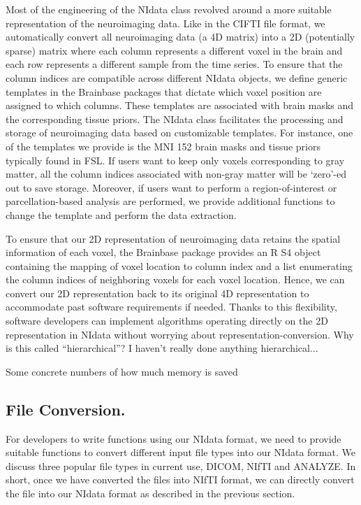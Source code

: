 \documentclass{nature}
\begin{document}
Most of the engineering of the NIdata class revolved around a more suitable
representation of the neuroimaging data. Like in the CIFTI file format\cite{Glasser2013The},
we automatically convert all neuroimaging data (a 4D matrix) 
into a 2D (potentially sparse) matrix where each
column represents a different voxel 
in the brain and each row represents 
a different sample from the time series. To ensure that the column indices are
compatible across different NIdata objects, we define generic templates in the
Brainbase packages that dictate which voxel position are assigned to which columns.
These templates are associated with brain masks and the corresponding tissue
priors.
The NIdata class facilitates the processing
and storage of neuroimaging data based on customizable
templates. 
For instance, one of the templates we provide is the MNI 152 brain masks and 
tissue priors typically found in FSL.
If users want to keep only voxels corresponding to gray matter, all the column
indices associated with non-gray matter will be `zero'-ed out to save storage.
Moreover, if users want to perform a
region-of-interest or parcellation-based analysis are performed, we provide
additional functions to change the template and perform the data extraction.

To ensure that our 2D representation of neuroimaging data retains the
spatial information of each voxel, the Brainbase package provides 
an R S4 object containing the mapping of voxel location to column index and
a list enumerating the column indices of neighboring voxels for each voxel
location. Hence, we can convert our 2D representation back to its original
4D representation to accommodate past software requirements if needed.
Thanks to this flexibility, software developers can 
implement algorithms operating directly on the 2D representation in
NIdata without worrying about representation-conversion. {\color{red}Why is this
called ``hierarchical''? I haven't really done anything hierarchical...}

{\color{red}Some concrete numbers of how much memory is saved}

\subsection{File Conversion.} 
For developers to write functions using our NIdata format, we need to provide
suitable functions to convert different input file types into our NIdata format.
We discuss three popular file types in current use, DICOM, NIfTI and ANALYZE.
In short, once we have converted the files into NIfTI format, we can directly
convert the file into our NIdata format as described in the previous section.
\end{document}
